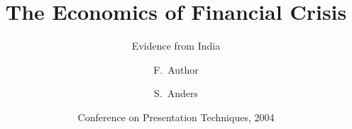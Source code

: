\documentclass{beamer} %
\begin{document}
  \title{The Economics of Financial Crisis}
  \subtitle{Evidence from India}
  \author[Author, Anders]{F.~Author \and S.~Anders}
  \date[KPT 2004]{Conference on Presentation Techniques, 2004}
  \subject{Computer Science}

  \frame{\titlepage}
  
\end{document}

